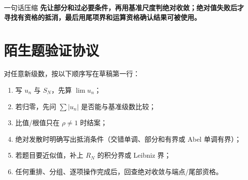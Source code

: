 \documentclass[11pt,a4paper,fontset=fandol]{ctexart}
\begin{document}
\begin{corebox}{一句话压缩}
\textbf{先让部分和过必要条件，再用基准尺度判绝对收敛；绝对值失败后才寻找有资格的抵消，最后用尾项界和运算资格确认结果可被使用。}
\end{corebox}

\section{陌生题验证协议}
对任意新级数，按以下顺序写在草稿第一行：
\begin{enumerate}
  \item 写 $u_n$ 与 $S_N$，先算 $\lim u_n$；
  \item 若归零，先问 $\sum\lvert u_n\rvert$ 是否能与基准级数比较；
  \item 比值/根值只在 $\rho\ne1$ 时结案；
  \item 绝对发散时明确写出抵消条件（交错单调、部分和有界或 Abel 单调有界）；
  \item 若题目要近似值，补上 $R_N$ 的积分界或 Leibniz 界；
  \item 任何重排、分组、逐项操作完成后，回查绝对收敛与端点/尾部资格。
\end{enumerate}
\end{document}
